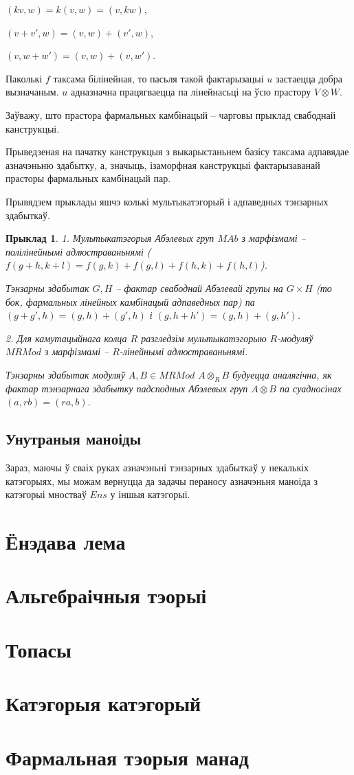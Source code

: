 \documentclass[a4paper,12pt]{book}
\newtheorem{example}{Прыклад}[section]
\begin{document}
$(kv, w) = k(v, w) = (v, kw)$,

$(v + v', w) = (v, w) + (v', w)$,

$(v, w + w') = (v, w) + (v, w')$.

Паколькі $f$ таксама білінейная, то пасьля такой фактарызацыі $u$
застаецца добра вызначаным. $u$ адназначна працягваецца па лінейнасьці
на ўсю прастору $V \otimes W$.

Заўважу, што прастора фармальных камбінацый -- чарговы прыклад
свабоднай канструкцыі.

Прыведзеная на пачатку канструкцыя з выкарыстаньнем базісу таксама
адпавядае азначэньню здабытку, а, значыць, ізаморфная канструкцыі
фактарызаванай прасторы фармальных камбінацый пар.

Прывядзем прыклады яшчэ колькі мультыкатэгорый і адпаведных тэнзарных
здабыткаў.

\begin{example}
  1. Мультыкатэгорыя Абэлевых груп $MAb$ з марфізмамі -- полілінейнымі
  адлюстраваньнямі ($f(g + h, k + l) = f(g, k) + f(g, l) + f(h, k) +
  f(h, l)$).

  Тэнзарны здабытак $G, H$ -- фактар свабоднай Абэлевай групы на $G
  \times H$ (то бок, фармальных лінейных камбінацый адпаведных пар) па
  $(g + g', h) = (g, h) + (g', h)$ і $(g, h + h') = (g, h) + (g, h')$.

  2. Для камутацыйнага колца $R$ разгледзім мультыкатэгорыю
  $R$-модуляў $MRMod$ з марфізмамі -- $R$-лінейнымі адлюстраваньнямі.

  Тэнзарны здабытак модуляў $A, B \in MRMod$ $A \otimes_R B$ будуецца
  аналягічна, як фактар тэнзарнага здабытку падсподных Абэлевых груп
  $A \otimes B$ па суадносінах $(a, rb) = (ra, b)$.
\end{example}

\section{Унутраныя маноіды}

Зараз, маючы ў сваіх руках азначэньні тэнзарных здабыткаў у некалькіх
катэгорыях, мы можам вернуцца да задачы пераносу азначэньня маноіда з
катэгорыі мностваў $Ens$ у іншыя катэгорыі.

\chapter{Ёнэдава лема}

\chapter{Альгебраічныя тэорыі}

\chapter{Топасы}

\chapter{Катэгорыя катэгорый}

\chapter{Фармальная тэорыя манад}
\end{document}
